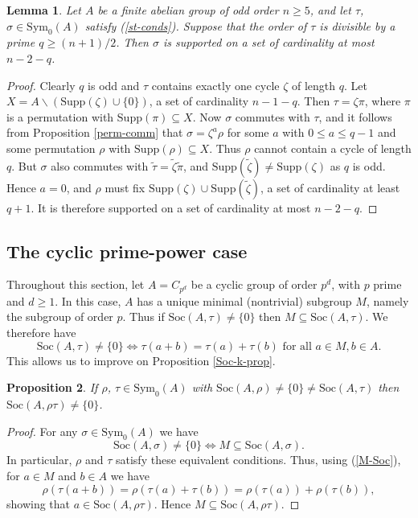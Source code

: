 \documentclass[letterpaper,12pt]{amsart}
\numberwithin{equation}{section}
\numberwithin{algorithm}{section}
\newtheorem{lemma}{Lemma}[section]
\newtheorem{proposition}[lemma]{Proposition}
\theoremstyle{definition}
\newcommand{\LRA}{\Leftrightarrow}
\newcommand{\Soc}{\mathrm{Soc}}
\newcommand{\Symo}{\mathrm{Sym}_0}
\newcommand{\ttau}{\tilde{\tau}}
\newcommand{\tzeta}{\tilde{\zeta}}
\newcommand{\tpi}{\tilde{\pi}}
\newcommand{\Supp}{\mathrm{Supp}}
\begin{document}
\begin{lemma} \label{long-cycle}
Let $A$ be a finite abelian group of odd order $n \geq 5$, and let $\tau$, $\sigma \in \Symo(A)$ satisfy (\ref{st-conds}). Suppose that the order of $\tau$ is divisible by a prime $q  \geq (n+1)/2$.  Then $\sigma$ is supported on a set of cardinality at most $n-2-q$.
\end{lemma}
\begin{proof}
Clearly $q$ is odd and $\tau$ contains exactly one cycle $\zeta$ of length $q$. Let $X=A \backslash (\Supp(\zeta) \cup \{0\})$, a set of cardinality $n-1-q$. Then $\tau = \zeta \pi$, where $\pi$ is a permutation with $\Supp(\pi) \subseteq X$. Now $\sigma$ commutes with $\tau$, and it follows from Proposition \ref{perm-comm} that $\sigma = \zeta^a \rho$ for some $a$ with $0 \leq a \leq q-1$ and some permutation $\rho$ with $\Supp(\rho) \subseteq X$. Thus $\rho$ cannot contain a cycle of length $q$. But $\sigma$ also commutes with $\ttau=\tzeta \tpi$, and $\Supp(\tzeta) \neq \Supp(\zeta)$ as $q$ is odd. Hence $a=0$, and $\rho$ must fix $\Supp(\zeta) \cup \Supp(\tzeta)$, a set of cardinality at least $q+1$. It is therefore supported on a set of cardinality at most $n-2-q$.
\end{proof}

\subsection{The cyclic prime-power case}

Throughout this section, let $A=C_{p^d}$ be a cyclic group of order $p^d$, with $p$ prime and $d \geq 1$. In this case, $A$ has a unique minimal (nontrivial) subgroup $M$, namely the subgroup of order $p$. Thus if $\Soc(A,\tau) \neq \{0\}$ then $M \subseteq \Soc(A,\tau)$. We therefore have
\begin{equation}  \label{M-Soc}
 \Soc(A,\tau) \neq \{0\} \LRA \tau(a+b)=\tau(a)+\tau(b) \mbox{ for all } a \in M, b \in A. 
\end{equation}
This allows us to improve on Proposition \ref{Soc-k-prop}.

\begin{proposition}  \label{compose-soc}
If $\rho$, $\tau \in \Symo(A)$ with $\Soc(A,\rho) \neq \{0\} \neq \Soc(A,\tau)$ then $\Soc(A,\rho \tau) \neq \{0\}$.
\end{proposition}
\begin{proof}
For any $\sigma \in \Symo(A)$ we have 
$$ \Soc(A,\sigma) \neq \{0\} \LRA M \subseteq \Soc(A,\sigma). $$
In particular, $\rho$ and $\tau$ satisfy these equivalent conditions. Thus, using (\ref{M-Soc}), for $a \in M$ and $b \in A$ we have  
$$ \rho(\tau(a+b))=\rho(\tau(a)+\tau(b))=\rho(\tau(a)) + \rho(\tau(b)), $$
showing that $a \in \Soc(A,\rho \tau)$. Hence $M \subseteq \Soc(A,\rho \tau)$. 
\end{proof}
	
\end{document}
